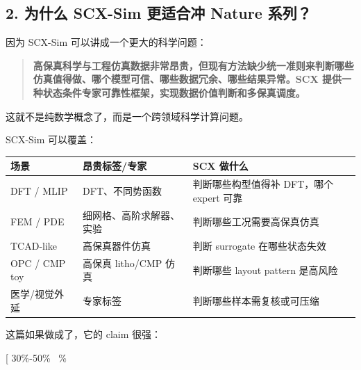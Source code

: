 \documentclass[
  12pt,
]{ctexart}
\begin{document}
\subsection{2. 为什么 SCX-Sim 更适合冲 Nature
系列？}\label{ux4e3aux4ec0ux4e48-scx-sim-ux66f4ux9002ux5408ux51b2-nature-ux7cfbux5217}

因为 SCX-Sim 可以讲成一个更大的科学问题：

\begin{quote}
\textbf{高保真科学与工程仿真数据非常昂贵，但现有方法缺少统一准则来判断哪些仿真值得做、哪个模型可信、哪些数据冗余、哪些结果异常。SCX
提供一种状态条件专家可靠性框架，实现数据价值判断和多保真调度。}
\end{quote}

这就不是纯数学概念了，而是一个跨领域科学计算问题。

SCX-Sim 可以覆盖：

\begin{longtable}[]{@{}
  >{\raggedright\arraybackslash}p{}
  >{\raggedright\arraybackslash}p{}
  >{\raggedright\arraybackslash}p{}@{}}
\toprule\noalign{}
\begin{minipage}[b]{\linewidth}\raggedright
场景
\end{minipage} & \begin{minipage}[b]{\linewidth}\raggedright
昂贵标签/专家
\end{minipage} & \begin{minipage}[b]{\linewidth}\raggedright
SCX 做什么
\end{minipage} \\
\midrule\noalign{}
\endhead
\bottomrule\noalign{}
\endlastfoot
DFT / MLIP & DFT、不同势函数 & 判断哪些构型值得补 DFT，哪个 expert
可靠 \\
FEM / PDE & 细网格、高阶求解器、实验 & 判断哪些工况需要高保真仿真 \\
TCAD-like & 高保真器件仿真 & 判断 surrogate 在哪些状态失效 \\
OPC / CMP toy & 高保真 litho/CMP 仿真 & 判断哪些 layout pattern
是高风险 \\
医学/视觉外延 & 专家标签 & 判断哪些样本需复核或可压缩 \\
\end{longtable}

这篇如果做成了，它的 claim 很强：

{[} 30\%-50\%~ \%~\text{full-budget performance}{]}
\end{document}
